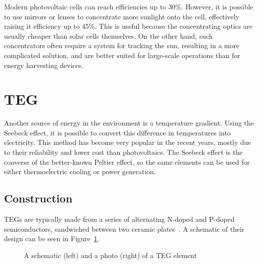 \documentclass[a4paper,10pt]{article}
\begin{document}
Modern photovoltaic cells can reach efficiencies up to 30\%. However, it is possible to use mirrors or lenses to concentrate more sunlight onto the cell, effectively raising it efficiency up to 45\%. This is useful because the concentrating optics are usually cheaper than solar cells themselves. On the other hand, such concentrators often require a system for tracking the sun, resulting in a more complicated solution, and are better suited for large-scale operations than for energy harvesting devices. 

\section{\acl{TEG}}

Another source of energy in the environment is a temperature gradient. Using the Seebeck effect, it is possible to convert this difference in temperatures into electricity. This method has become very popular in the recent years, mostly due to their reliability and lower cost than photovoltaics. The Seebeck effect is the converse of the better-known Peltier effect, so the same elements can be used for either thermoelectric cooling or power generation. 

\subsection{Construction}

\acp{TEG} are typically made from a series of alternating N-doped and P-doped semiconductors, sandwiched between two ceramic plates~\cite{Salerno10}. A schematic of their design can be seen in Figure~\ref{fig:teg-schematic}.

\begin{figure}[h]
\caption{A schematic (left) and a photo (right) of a \ac{TEG} element~\cite{Salerno10,wiki:teg}}
\label{fig:teg-schematic}
\end{figure}
\end{document}
